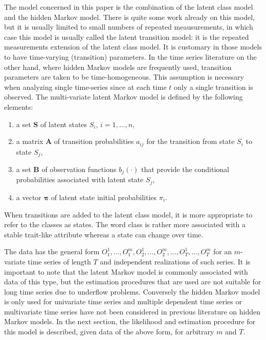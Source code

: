 \documentclass[a4paper,12pt,doc]{apaIngmar} %
\newcommand{\mat}{\mathbf}
\newcommand{\vc}{\mathbf}
\begin{document}
The model concerned in this paper is the combination of the latent
class model and the hidden Markov model.  There is quite some work
already on this model, but it is usually limited to small numbers of
repeated meausurements, in which case this model is usually called the
latent transition model: it is the repeated measurements extension of
the latent class model.  It is customary in those models to have
time-varying (transition) parameters.  In the time series literature
on the other hand, where hidden Markov models are frequently used,
transition parameters are taken to be time-homogeneous.  This
assumption is necessary when analyzing single time-series since at
each time $t$ only a single transition is observed.  The multi-variate
latent Markov model is defined by the following elements:
\begin{enumerate}
	\item a set $\vc{S}$ of latent states $S_{i},\, i=1, \ldots , n$,
	
	\item a matrix $\mat{A}$ of transition probabilities $a_{ij}$ for
	the transition from state $S_{i}$ to state $S_{j}$,
	
	\item a set $\vc{B}$ of observation functions $b_{j}(\cdot)$ that
	provide the conditional probabilities associated with latent state
	$S_{j}$,
	
	\item a vector $\pmb{\pi}$ of latent state initial probabilities
	$\pi_{i}$.
\end{enumerate}
When transitions are added to the latent class model, it is more
appropriate to refer to the classes as states.  The word class is
rather more associated with a stable trait-like attribute whereas a
state can change over time.

The data has the general form $O_{1}^{1}, \ldots, O_{1}^{m},
O_{2}^{1}, \ldots, O_{2}^{m}, \ldots, O_{T}^{1}, \ldots, O_{T}^{m}$
for an $m$-variate time series of length $T$ and independent
realizations of such series.  It is important to note that the latent
Markov model is commonly associated with data of this type, but the
estimation procedures that are used are not suitable for long time
series due to underflow problems.  Conversely the hidden Markov model
is only used for univariate time series and multiple dependent time
series or multivariate time series have not been considered in
previous literature on hidden Markov models.  In the next section, the
likelihood and estimation procedure for this model is described, given
data of the above form, for arbitrary $m$ and $T$.
\end{document}
